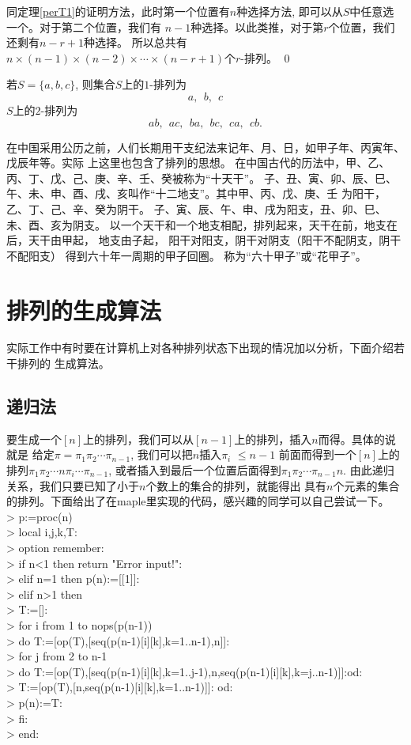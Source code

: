 \pf 同定理\ref{perT1}的证明方法，此时第一个位置有$n$种选择方法, 即可以从$S$中任意选一个。对于第二个位置，我们有
$n-1$种选择。以此类推，对于第$r$个位置，我们还剩有$n-r+1$种选择。
所以总共有$n\times (n-1) \times (n-2)\times \cdots \times (n-r+1)$个$r$-排列。 \qed

\begin{exa}
若$S=\{a,b,c\}$, 则集合$S$上的$1$-排列为
\[ a,~~b,~~c\]
$S$上的$2$-排列为
\[ ab,~~ac,~~ba,~~bc,~~ca,~~cb.\]
\end{exa}


\begin{exa}
在中国采用公历之前，人们长期用干支纪法来记年、月、日，如甲子年、丙寅年、戊辰年等。实际
上这里也包含了排列的思想。
在中国古代的历法中，甲、乙、丙、丁、戊、己、庚、辛、壬、癸被称为“十天干”。
子、丑、寅、卯、辰、巳、午、未、申、酉、戌、亥叫作“十二地支”。其中甲、丙、戊、庚、壬
为阳干，乙、丁、己、辛、癸为阴干。
子、寅、辰、午、申、戌为阳支，丑、卯、巳、未、酉、亥为阴支。
以一个天干和一个地支相配，排列起来，天干在前，地支在后，天干由甲起，
地支由子起，
阳干对阳支，阴干对阴支（阳干不配阴支，阴干不配阳支）
得到六十年一周期的甲子回圈。
称为“六十甲子”或“花甲子”。
\end{exa}

\section{排列的生成算法}
实际工作中有时要在计算机上对各种排列状态下出现的情况加以分析，下面介绍若干排列的
生成算法。

\subsection{递归法}
要生成一个$[n]$上的排列，我们可以从$[n-1]$上的排列，插入$n$而得。具体的说就是
给定$\pi=\pi_1\pi_2
\cdots \pi_{n-1}$, 我们可以把$n$插入$\pi_i$ $\leq n-1$ 前面而得到一个$[n]$上的排列$\pi_1\pi_2
\cdots n \pi_i \cdots \pi_{n-1}$, 或者插入到最后一个位置后面得到$\pi_1\pi_2
\cdots \pi_{n-1}n$. 由此递归关系，我们只要已知了小于$n$个数上的集合的排列，就能得出
具有$n$个元素的集合的排列。下面给出了在maple里实现的代码，感兴趣的同学可以自己尝试一下。
\\
> p:=proc(n)\\
> local i,j,k,T:\\
> option remember:\\
> if n<1 then return "Error input!":\\
> elif n=1 then p(n):=[[1]]:\\
> elif n>1 then\\
> T:=[]:\\
> for i from 1 to nops(p(n-1))\\
> do T:=[op(T),[seq(p(n-1)[i][k],k=1..n-1),n]]:\\
> for j from 2 to n-1\\
> do T:=[op(T),[seq(p(n-1)[i][k],k=1..j-1),n,seq(p(n-1)[i][k],k=j..n-1)]]:od:\\
> T:=[op(T),[n,seq(p(n-1)[i][k],k=1..n-1)]]: od:\\
> p(n):=T:\\
> fi:\\
> end:\\

